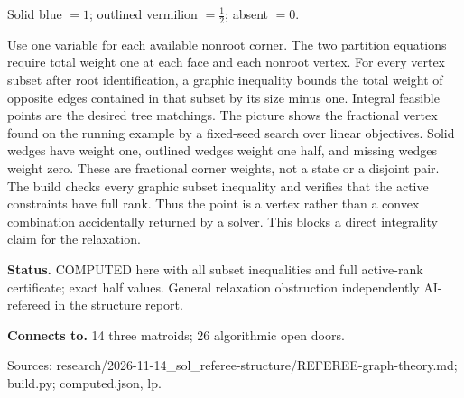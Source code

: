 \begin{center}
\begin{minipage}{.86\textwidth}
\par Solid blue $=1$; outlined vermilion $=\frac12$; absent $=0$.
\end{minipage}\end{center}
Use one variable for each available nonroot corner. The two partition equations require total weight one at each face and each nonroot vertex. For every vertex subset after root identification, a graphic inequality bounds the total weight of opposite edges contained in that subset by its size minus one. Integral feasible points are the desired tree matchings. The picture shows the fractional vertex found on the running example by a fixed-seed search over linear objectives. Solid wedges have weight one, outlined wedges weight one half, and missing wedges weight zero. These are fractional corner weights, not a state or a disjoint pair. The build checks every graphic subset inequality and verifies that the active constraints have full rank. Thus the point is a vertex rather than a convex combination accidentally returned by a solver. This blocks a direct integrality claim for the relaxation.

\textbf{Status.} COMPUTED here with all subset inequalities and full active-rank certificate; exact half values. General relaxation obstruction independently AI-refereed in the structure report.

\textbf{Connects to.} 14 three matroids; 26 algorithmic open doors.

{\footnotesize\raggedright Sources: research/\allowbreak{}2026-11-14\_sol\_referee-structure/\allowbreak{}REFEREE-graph-theory.md;\allowbreak{} build.py;\allowbreak{} computed.json, lp.\par}
